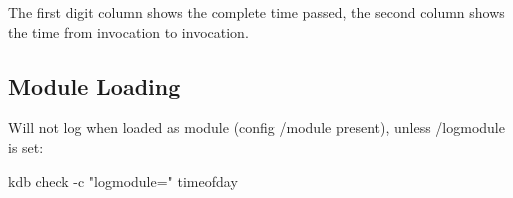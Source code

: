 The first digit column shows the complete time passed, the second column shows the time from invocation to invocation.

\subsection*{Module Loading}

Will not log when loaded as module (config {\ttfamily /module} present), unless {\ttfamily /logmodule} is set\+:


\begin{DoxyCode}
kdb check -c "logmodule=" timeofday
\end{DoxyCode}
 